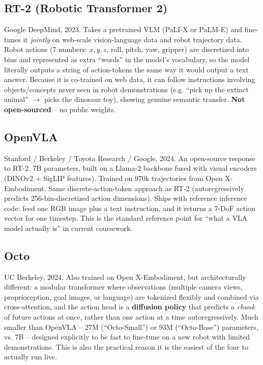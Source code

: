 \documentclass[a4paper,11pt]{article}
\begin{document}
\subsection{RT-2 (Robotic Transformer 2)}
Google DeepMind, 2023. Takes a pretrained VLM (PaLI-X or PaLM-E) and fine-tunes it \emph{jointly} on web-scale vision-language data and robot trajectory data. Robot actions (7 numbers: $x, y, z$, roll, pitch, yaw, gripper) are discretized into bins and represented as extra ``words'' in the model's vocabulary, so the model literally outputs a string of action-tokens the same way it would output a text answer. Because it is co-trained on web data, it can follow instructions involving objects/concepts never seen in robot demonstrations (e.g. ``pick up the extinct animal'' $\rightarrow$ picks the dinosaur toy), showing genuine semantic transfer. \textbf{Not open-sourced} -- no public weights.

\subsection{OpenVLA}
Stanford / Berkeley / Toyota Research / Google, 2024. An open-source response to RT-2. 7B parameters, built on a Llama-2 backbone fused with visual encoders (DINOv2 + SigLIP features). Trained on 970k trajectories from Open X-Embodiment. Same discrete-action-token approach as RT-2 (autoregressively predicts 256-bin-discretized action dimensions). Ships with reference inference code: feed one RGB image plus a text instruction, and it returns a 7-DoF action vector for one timestep. This is the standard reference point for ``what a VLA model actually is'' in current coursework.

\subsection{Octo}
UC Berkeley, 2024. Also trained on Open X-Embodiment, but architecturally different: a modular transformer where observations (multiple camera views, proprioception, goal images, or language) are tokenized flexibly and combined via cross-attention, and the action head is a \textbf{diffusion policy} that predicts a \emph{chunk} of future actions at once, rather than one action at a time autoregressively. Much smaller than OpenVLA -- 27M (``Octo-Small'') or 93M (``Octo-Base'') parameters, vs. 7B -- designed explicitly to be fast to fine-tune on a new robot with limited demonstrations. This is also the practical reason it is the easiest of the four to actually run live.
\end{document}
